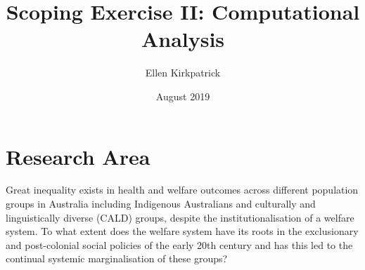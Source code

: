 \documentclass{article}
\title{Scoping Exercise II: Computational Analysis}
\author{ Ellen Kirkpatrick }
\date{August 2019}
\begin{document}
\maketitle

\section{Research Area}
Great inequality exists in health and welfare outcomes across different population groups in Australia including Indigenous Australians and culturally and linguistically diverse (CALD) groups, despite the institutionalisation of a welfare system. To what extent does the welfare system have its roots in the exclusionary and post-colonial social policies of the early 20th century and has this led to the continual systemic marginalisation of these groups?\\
\end{document}
